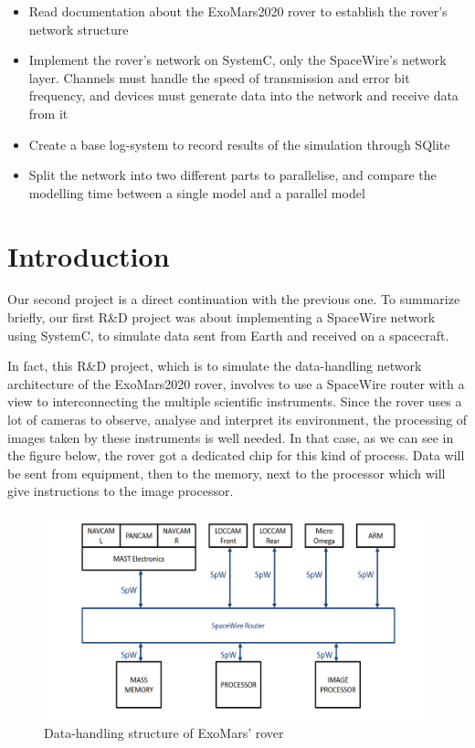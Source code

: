 \documentclass[12pt,a4paper]{article}
\begin{document}
\begin{itemize}
    \item Read documentation about the ExoMars2020 rover to establish the rover's network structure
    \item Implement the rover's network on SystemC, only the SpaceWire's network layer. Channels must handle the speed of transmission and error bit frequency, and devices must generate data into the network and receive data from it
    \item Create a base log-system to record results of the simulation through SQlite
    \item Split the network into two different parts to parallelise, and compare the modelling time between a single model and a parallel model
\end{itemize}
\section{Introduction}

Our second project is a direct continuation with the previous one. To summarize briefly, our first R\&D project was about implementing a SpaceWire network using SystemC, to simulate data sent from Earth and received on a spacecraft.\smallbreak

In fact, this R\&D project, which is to simulate the data-handling network architecture of the ExoMars2020 rover, involves to use a SpaceWire router with a view to interconnecting the multiple scientific instruments. Since the rover uses a lot of cameras to observe, analyse and interpret its environment, the processing of images taken by these instruments is well needed. In that case, as we can see in the figure below, the rover got a dedicated chip for this kind of process. Data will be sent from equipment, then to the memory, next to the processor which will give instructions to the image processor.\smallbreak

\begin{figure}[hb]
	\centering
    \includegraphics[scale = 0.49]{pictures/data_network_architecture.png}
    \caption{Data-handling structure of ExoMars' rover}
\end{figure}
\end{document}
